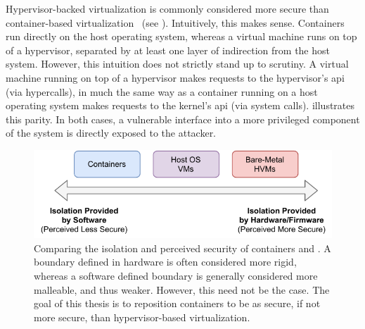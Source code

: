 Hypervisor-backed virtualization is commonly considered more secure than
con\-tain\-er-based virtualization~\cite{sultan2019_container_security,
eder2016_hypervisor_container} (see ). Intuitively, this
makes sense.  Containers run directly on the host operating system, whereas a virtual
machine runs on top of a hypervisor, separated by at least one layer of indirection from
the host system.  However, this intuition does not strictly stand up to scrutiny.
A virtual machine running on top of a hypervisor makes requests to the hypervisor's
\gls{api} (via hypercalls), in much the same way as a container running on a host
operating system makes requests to the kernel's \gls{api} (via system calls).
 illustrates this parity. In both cases, a vulnerable
interface into a more privileged component of the system is directly exposed to the
attacker.

\begin{figure}[htbp]
  \centering
  \includegraphics[width=0.8\linewidth]{figs/confinement-problem/security.pdf}
  \caption[Comparing the isolation and perceived security of containers and ]{
    Comparing the isolation and perceived security of containers and
    . A boundary defined in hardware is often considered more rigid,
    whereas a software defined boundary is generally considered more malleable, and thus
    weaker. However, this need not be the case. The goal of this thesis is to reposition
    containers to be as secure, if not more secure, than hypervisor-based virtualization.
  }%
  \label{fig:container-hvm-security}
\end{figure}

